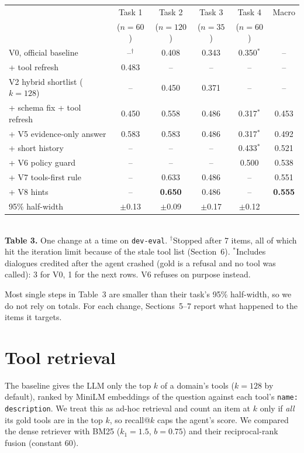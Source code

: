 \documentclass[10pt]{article}
\begin{document}
\begin{center}\small
\begin{tabular}{@{}lccccc@{}}
\toprule
 & Task 1 & Task 2 & Task 3 & Task 4 & Macro \\
 & ($n{=}60$) & ($n{=}120$) & ($n{=}35$) & ($n{=}60$) & \\
\midrule
V0, official baseline                 & --$^{\dagger}$ & 0.408 & 0.343 & 0.350$^{\ast}$ & -- \\
\quad + tool refresh                  & 0.483 & -- & -- & -- & -- \\
V2 hybrid shortlist ($k{=}128$)       & -- & 0.450 & 0.371 & -- & -- \\
\quad + schema fix + tool refresh     & 0.450 & 0.558 & 0.486 & 0.317$^{\ast}$ & 0.453 \\
\quad + V5 evidence-only answer       & 0.583 & 0.583 & 0.486 & 0.317$^{\ast}$ & 0.492 \\
\quad + short history                 & -- & -- & -- & 0.433$^{\ast}$ & 0.521 \\
\quad + V6 policy guard               & -- & -- & -- & 0.500 & 0.538 \\
\quad + V7 tools-first rule           & -- & 0.633 & 0.486 & -- & 0.551 \\
\quad + V8 hints                      & -- & \textbf{0.650} & 0.486 & -- & \textbf{0.555} \\
\midrule
95\% half-width                       & $\pm$0.13 & $\pm$0.09 & $\pm$0.17 & $\pm$0.12 & \\
\bottomrule
\end{tabular}\\[0.2em]
{\footnotesize \textbf{Table 3.} One change at a time on \texttt{dev-eval}.
$^{\dagger}$Stopped after 7 items, all of which hit the iteration limit because of the stale
tool list (Section~6). $^{\ast}$Includes dialogues credited after the agent crashed (gold is a
refusal and no tool was called): 3 for V0, 1 for the next rows. V6 refuses on purpose instead.}
\end{center}

Most single steps in Table~3 are smaller than their task's 95\% half-width, so we do not rely
on totals. For each change, Sections~5--7 report what happened
to the items it targets.

\section{Tool retrieval}
The baseline gives the LLM only the top $k$ of a domain's tools ($k{=}128$ by default), ranked
by MiniLM embeddings of the question against each tool's \texttt{name: description}. We treat
this as ad-hoc retrieval and count an item at $k$ only if \emph{all} its gold tools are in the
top $k$, so recall@$k$ caps the agent's score. We compared the dense retriever with BM25
($k_1{=}1.5$, $b{=}0.75$) and their reciprocal-rank fusion (constant 60).
\end{document}
